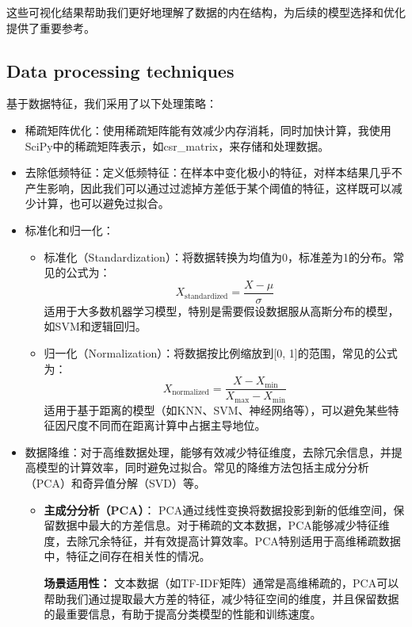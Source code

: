 \documentclass[11pt,a4paper]{article}
\begin{document}
这些可视化结果帮助我们更好地理解了数据的内在结构，为后续的模型选择和优化提供了重要参考。


\subsection{Data processing techniques}
基于数据特征，我们采用了以下处理策略：
\begin{itemize}
    \item 稀疏矩阵优化：使用稀疏矩阵能有效减少内存消耗，同时加快计算，我使用SciPy中的稀疏矩阵表示，如csr\_matrix，来存储和处理数据。
    \item 去除低频特征：定义低频特征：在样本中变化极小的特征，对样本结果几乎不产生影响，因此我们可以通过过滤掉方差低于某个阈值的特征，这样既可以减少计算，也可以避免过拟合。
    \item 标准化和归一化：
    \begin{itemize}
        \item 标准化（Standardization）：将数据转换为均值为0，标准差为1的分布。常见的公式为：
        \[
        X_{\text{standardized}} = \frac{X - \mu}{\sigma}
        \]
        适用于大多数机器学习模型，特别是需要假设数据服从高斯分布的模型，如SVM和逻辑回归。
        
        \item 归一化（Normalization）：将数据按比例缩放到[0, 1]的范围，常见的公式为：
        \[
        X_{\text{normalized}} = \frac{X - X_{\min}}{X_{\max} - X_{\min}}
        \]
        适用于基于距离的模型（如KNN、SVM、神经网络等），可以避免某些特征因尺度不同而在距离计算中占据主导地位。
    \end{itemize}

    \item 数据降维：对于高维数据处理，能够有效减少特征维度，去除冗余信息，并提高模型的计算效率，同时避免过拟合。常见的降维方法包括主成分分析（PCA）和奇异值分解（SVD）等。

    \begin{itemize}
        \item \textbf{主成分分析（PCA）}：
        PCA通过线性变换将数据投影到新的低维空间，保留数据中最大的方差信息。对于稀疏的文本数据，PCA能够减少特征维度，去除冗余特征，并有效提高计算效率。PCA特别适用于高维稀疏数据中，特征之间存在相关性的情况。
        
        \textbf{场景适用性：} 文本数据（如TF-IDF矩阵）通常是高维稀疏的，PCA可以帮助我们通过提取最大方差的特征，减少特征空间的维度，并且保留数据的最重要信息，有助于提高分类模型的性能和训练速度。
    

\end{itemize}
\end{itemize}
\end{document}
